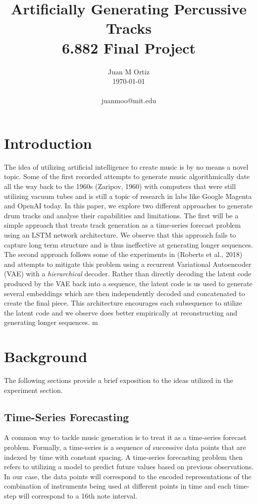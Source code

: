 \documentclass[10pt,twocolumn]{article}
\begin{document}
\title{Artificially Generating Percussive Tracks \\ \large{6.882 Final Project}}

\author{Juan M Ortiz \\
\today
\\
\\
juanmoo@mit.edu  \\
}

\maketitle

\section{Introduction}
  The idea of utilizing artificial intelligence to create music is by no means a novel topic. Some of the first recorded attempts to generate music algorithmically date all the way back to the 1960s (Zaripov, 1960) \cite{zaripov1960algorithmic} with computers that were still utilizing vacuum tubes and is still a topic of research in labs like Google Magenta and OpenAI today. In this paper, we explore two different approaches to generate drum tracks and analyse their capabilities and limitations. The first will be a simple approach that treats track generation as a time-series forecast problem using an LSTM network architecture. We observe that this approach fails to capture long term structure and is thus ineffective at generating longer sequences. The second approach follows some of the experiments in (Roberts et al., 2018) \cite{roberts2018hierarchical} and attempts to mitigate this problem using a recurrent Variational Autoencoder (VAE) with a \textit{hierarchical} decoder. Rather than directly decoding the latent code produced by the VAE back into a sequence, the latent code is us used to generate several embeddings which are then independently decoded and concatenated to create the final piece. This architecture encourages each subsequence to utilize the latent code and we observe does better empirically at reconstructing and generating longer sequences.
  m 

\section{Background}
The following sections provide a brief exposition to the ideas utilized in the experiment section. 

\subsection{Time-Series Forecasting}
A common way to tackle music generation is to treat it as a time-series forecast problem. Formally, a time-series is a sequence of successive data points that are indexed by time with constant spacing. A time-series forecasting problem then refers to utilizing a model to predict future values based on previous observations. In our case, the data points will correspond to the encoded representations of the combination of instruments being used at different points in time and each time-step will correspond to a 16th note interval. 
\end{document}
